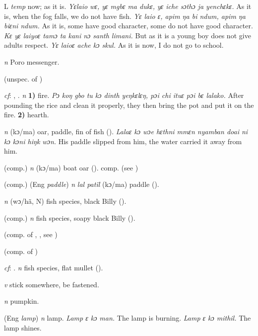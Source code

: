 \begin{letter}{L}
 \textit{temp} now; as it is. \textit{Yɛlaio wɛ, yɛ mgbɛ ma dukɛ, yɛ iche sɔthɔ ja yenchɛkɛ.} As it is, when the fog falls, we do not have fish. \textit{Yɛ laio ɛ, apim ŋa bi ndum, apim ŋa biɛni ndum.} As it is, some have good character, some do not have good character. \textit{Kɛ yɛ laiyoɛ tamɔ ta kani nɔ santh limani.} But as it is a young boy does not give adults respect. \textit{Yɛ laioɛ ache kɔ skul.} As it is now, I do not go to school.

 \textit{n} Poro messenger.

 (unspec. of ) 

 \textit{cf}: , . \textit{n} \textbf{1)} fire. \textit{Pɔ koŋ gbo tu kɔ dinth yeŋkɛlɛŋ, pɔi chi ituɛ pɔi bɛ lalako.} After pounding the rice and clean it properly, they then bring the pot and put it on the fire. \textbf{2)} hearth.

 \textit{n} (kɔ/ma) oar, paddle, fin of fish (\citealt{Pichl1967}). \textit{Lalaɛ kɔ wɔe hɛthni mmɛn nyamban doai ni kɔ kɔni hiŋk wɔn.} His paddle slipped from him, the water carried it away from him.

 (comp.) \textit{n} (kɔ/ma) boat oar (\citealt{Pichl1967}). comp.  (see ) 

 (comp.) (Eng \textit{paddle}) \textit{n} \textit{lal patïl} (kɔ/ma) paddle (\citealt{Pichl1967}). 

 \textit{n} (wɔ/hã, N) fish species, black Billy (\citealt{Pichl1967}). 

 (comp.) \textit{n} fish species, soapy black Billy (\citealt{Pichl1967}). 

 (comp. of , , see ) 

 (comp. of ) 

 \textit{cf}: . \textit{n} fish species, flat mullet (\citealt{Pichl1967}). 

 \textit{v} stick somewhere, be fastened. 

 \textit{n} pumpkin.

 (Eng \textit{lamp}) \textit{n} lamp. \textit{Lamp ɛ kɔ man.} The lamp is burning. \textit{Lamp ɛ kɔ mithil.} The lamp
shines.


\end{letter}
